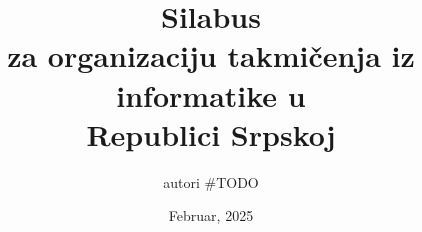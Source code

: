\renewcommand{\contentsname}{Sadržaj} 

\title{\textbf{Silabus} \\ za organizaciju takmičenja iz informatike u \\ Republici Srpskoj}
\author{autori \#TODO}
\date{Februar, 2025}

